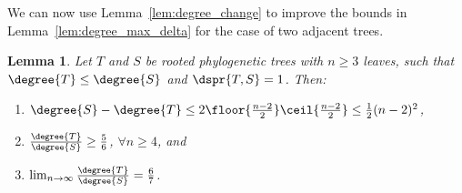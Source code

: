 \documentclass[11pt,onecolumn,conference]{IEEEtran}
\newtheorem{lemma}[theorem]{Lemma}
\begin{document}
We can now use Lemma~\ref{lem:degree_change} to improve the bounds in Lemma~\ref{lem:degree_max_delta} for the case of two adjacent trees.
\begin{lemma}
	\label{lem:degree_max_delta_adjacent}
	Let $T$ and $S$ be rooted phylogenetic trees with $n \ge 3$ leaves, such that $\degree{T} \le \degree{S}$ and $\dspr{T,S} = 1$.
	Then:
	\begin{enumerate}
		\item $\degree{S} - \degree{T} \le 2\floor{\frac{n-2}{2}}\ceil{\frac{n-2}{2}} \le \frac{1}{2} (n-2)^2 $,
		\item $\frac{\degree{T}}{\degree{S}} \ge \frac{5}{6}$, $\forall n \ge 4$, and
		\item $\lim_{n\rightarrow\infty}\frac{\degree{T}}{\degree{S}} =  \frac{6}{7}$.
	\end{enumerate}
\end{lemma}
\end{document}

